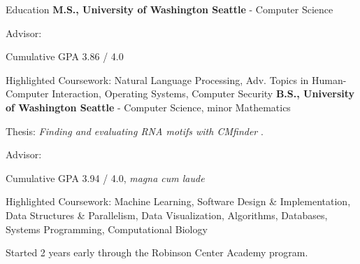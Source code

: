 \begin{rubric}{Education}
	\textbf{M.S., University of Washington Seattle} - Computer Science
    \par Advisor: \pWeldD{}
    \par Cumulative GPA 3.86 / 4.0
    \par Highlighted Coursework: Natural Language Processing, Adv. Topics in Human-Computer Interaction, Operating Systems, Computer Security
\entry*[2016 -- 2019] %
	\textbf{B.S., University of Washington Seattle} - Computer Science, minor Mathematics
	\par Thesis: \emph{Finding and evaluating RNA motifs with CMfinder} \cite{zhou2019thesis}.
	\par Advisor: \pRuzzoL{}
	\par Cumulative GPA 3.94 / 4.0, \textit{magna cum laude}
	\par Highlighted Coursework: Machine Learning, Software Design \& Implementation, Data Structures \& Parallelism, Data Visualization, Algorithms, Databases, Systems Programming, Computational Biology
	\par Started 2 years early through the Robinson Center Academy program.
\end{rubric}